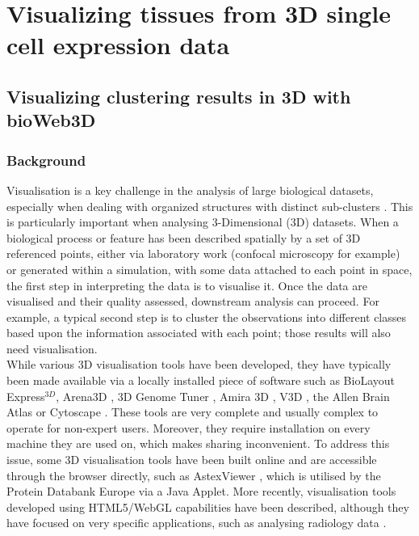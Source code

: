 \chapter{Visualizing tissues from 3D single cell expression data}\label{ch:non_spatial_clustering_visualization} 

\section{Visualizing clustering results in 3D with bioWeb3D}
	\subsection{Background}

Visualisation is a key challenge in the analysis of large biological datasets, especially when dealing with organized structures with distinct sub-clusters \citep{Rubel10}. This is particularly important when analysing 3-Dimensional (3D) datasets. When a biological process or feature has been described spatially by a set of 3D referenced points, either via laboratory work (confocal microscopy for example) or generated within a simulation, with some data attached to each point in space, the first step in interpreting the data is to visualise it. Once the data are visualised and their quality assessed, downstream analysis can proceed. For example, a typical second step is to cluster the observations into different classes based upon the information associated with each point; those results will also need visualisation. \\

While various 3D visualisation tools have been developed, they have typically been made available via a locally installed piece of software such as BioLayout Express$^{3D}$\citep{Freeman07}, Arena3D \citep{Pavlopoulos08},  3D Genome Tuner \citep{Wang093D}, Amira 3D \citep{Stalling05}, V3D \citep{Peng10}, the Allen Brain Atlas \citep{Lein07} or Cytoscape \citep{Shannon03}. These tools are very complete and usually complex to operate for non-expert users. Moreover, they require installation on every machine they are used on, which makes sharing inconvenient. To address this issue, some 3D visualisation tools have been built online and are accessible through the browser directly, such as AstexViewer \citep{Hartshorn02}, which is utilised by the Protein Databank Europe via a Java Applet. More recently, visualisation tools developed using HTML5/WebGL capabilities have been described, although they have focused on very specific applications, such as analysing radiology data  \citep{Dinesh12}.\\

